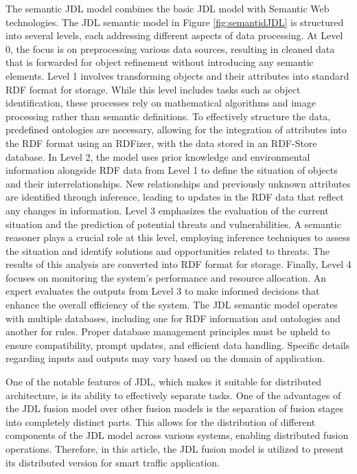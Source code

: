 \documentclass[5p,times]{elsarticle}
\begin{document}
The semantic JDL model \cite{noughabi2013semfus} combines the basic JDL model with Semantic Web technologies.
The JDL semantic model in Figure \ref{fig:semantidJDL} is structured into several levels, each addressing different aspects of data processing. At Level 0, the focus is on preprocessing various data sources, resulting in cleaned data that is forwarded for object refinement without introducing any semantic elements. Level 1 involves transforming objects and their attributes into standard RDF format for storage. While this level includes tasks such as object identification, these processes rely on mathematical algorithms and image processing rather than semantic definitions. To effectively structure the data, predefined ontologies are necessary, allowing for the integration of attributes into the RDF format using an RDFizer, with the data stored in an RDF-Store database.
In Level 2, the model uses prior knowledge and environmental information alongside RDF data from Level 1 to define the situation of objects and their interrelationships. New relationships and previously unknown attributes are identified through inference, leading to updates in the RDF data that reflect any changes in information.
Level 3 emphasizes the evaluation of the current situation and the prediction of potential threats and vulnerabilities. A semantic reasoner plays a crucial role at this level, employing inference techniques to assess the situation and identify solutions and opportunities related to threats. The results of this analysis are converted into RDF format for storage.
Finally, Level 4 focuses on monitoring the system's performance and resource allocation. An expert evaluates the outputs from Level 3 to make informed decisions that enhance the overall efficiency of the system. The JDL semantic model operates with multiple databases, including one for RDF information and ontologies and another for rules. Proper database management principles must be upheld to ensure compatibility, prompt updates, and efficient data handling. Specific details regarding inputs and outputs may vary based on the domain of application.

One of the notable features of JDL, which makes it suitable for distributed architecture, is its ability to effectively separate tasks.
One of the advantages of the JDL fusion model over other fusion models is the separation of fusion stages into completely
distinct parts. This allows for the distribution of different components of the JDL model across various systems, 
enabling distributed fusion operations. 
Therefore, in this article, the JDL fusion model is utilized to present its distributed version 
for smart traffic application.
\end{document}
